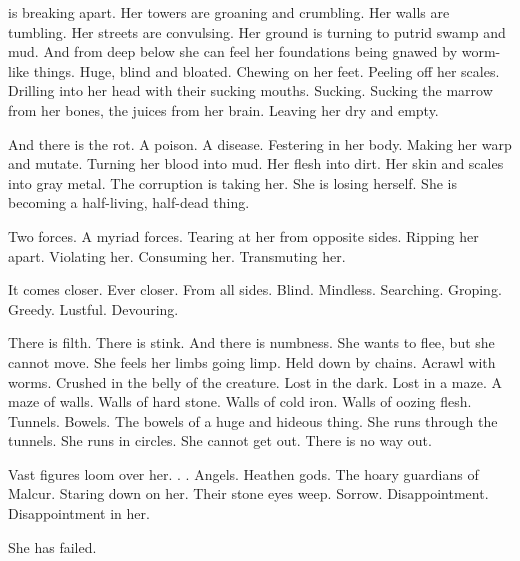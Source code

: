 
\begin{comment}
\section{Tiroco dreams}
\end{comment}

\begin{dream}
\Tiroco{} is breaking apart. 
Her towers are groaning and crumbling. 
Her walls are tumbling. 
Her streets are convulsing. 
Her ground is turning to putrid swamp and mud. 
And from deep below she can feel her foundations being gnawed by worm-like things.
Huge, blind and bloated. 
Chewing on her feet. 
Peeling off her scales. 
Drilling into her head with their sucking mouths. 
Sucking. 
Sucking the marrow from her bones, the juices from her brain. 
Leaving her dry and empty. 

And there is the rot. 
A poison. 
A disease. 
Festering in her body. 
Making her warp and mutate. 
Turning her blood into mud. 
Her flesh into dirt. 
Her skin and scales into gray metal. 
The corruption is taking her. 
She is losing herself. 
She is becoming a half-living, half-dead thing. 

Two forces. 
A myriad forces. 
Tearing at her from opposite sides. 
Ripping her apart. 
Violating her. 
Consuming her. 
Transmuting her. 

It comes closer. 
Ever closer. 
From all sides. 
Blind. 
Mindless. 
Searching. 
Groping. 
Greedy. 
Lustful. 
Devouring. 

There is filth. 
There is stink. 
And there is numbness. 
She wants to flee, but she cannot move. 
She feels her limbs going limp. 
Held down by chains. 
Acrawl with worms. 
Crushed in the belly of the creature. 
Lost in the dark. 
Lost in a maze. 
A maze of walls. 
Walls of hard stone. 
Walls of cold iron. 
Walls of oozing flesh. 
Tunnels. 
Bowels. 
The bowels of a huge and hideous thing. 
She runs through the tunnels. 
She runs in circles. 
She cannot get out. 
There is no way out. 

Vast figures loom over her. 
\Scathae{}. 
\Humans. 
Angels. 
Heathen gods. 
The hoary guardians of Malcur. 
Staring down on her. 
Their stone eyes weep. 
Sorrow.
Disappointment. 
Disappointment in her. 

She has failed. 
\end{dream}

